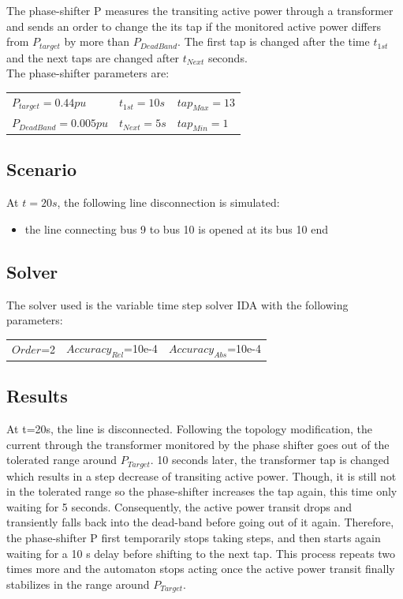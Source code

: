 \documentclass[a4paper, 12pt]{report}
\begin{document}
The phase-shifter P measures the transiting active power through a transformer and sends an order to change the its tap if the monitored active power differs from $P_{target}$ by more than $P_{DeadBand}$. The first tap is changed after the time $t_{1st}$ and the next taps are changed after $t_{Next}$ seconds.\\

The phase-shifter parameters are:
\begin{center}
\begin{tabular}{l|l|l}
   $P_{target}=0.44pu$ & $t_{1st}=10s$ & $tap_{Max}=13$ \\
   $P_{DeadBand}=0.005pu$  & $t_{Next}=5s$ & $tap_{Min}=1$ \\
\end{tabular}
\end{center}

\subsection{Scenario}
At $t=20s$, the following line disconnection is simulated:
\begin{itemize}
\item{the line connecting bus 9 to bus 10 is opened at its bus 10 end}
\end{itemize}

\subsection{Solver}
The solver used is the variable time step solver IDA with the following parameters:
\begin{center}
\begin{tabular}{l|l|l}
   $Order$=2 & $Accuracy_{Rel}$=10e-4 & $Accuracy_{Abs}$=10e-4 \\
\end{tabular}
\end{center}

\newpage
\subsection{Results}

At t=20s, the line is disconnected. Following the topology modification, the current through the transformer monitored by the phase shifter goes out of the tolerated range around $P_{Target}$.  10 seconds later, the transformer tap is changed which results in a step decrease of transiting active power. Though, it is still not in the tolerated range so the phase-shifter increases the tap again, this time only waiting for 5 seconds. Consequently, the active power transit drops and transiently falls back into the dead-band before going out of it again. Therefore, the phase-shifter P first temporarily stops taking steps, and then starts again waiting for a 10 s delay before shifting to the next tap. This process repeats two times more and the automaton stops acting once the active power transit finally stabilizes in the range around $P_{Target}$. \\
\end{document}
